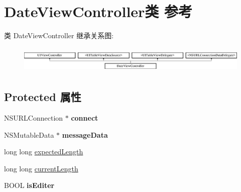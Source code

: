 \hypertarget{interface_date_view_controller}{\section{Date\-View\-Controller类 参考}
\label{interface_date_view_controller}
}
类 Date\-View\-Controller 继承关系图\-:\begin{figure}[H]
\begin{center}
\leavevmode
\includegraphics[height=1.308411cm]{interface_date_view_controller}
\end{center}
\end{figure}
\subsection*{Protected 属性}
\begin{DoxyCompactItemize}
\item 
\hypertarget{interface_date_view_controller_aff4f3095196456defce55a638c87b1d8}{N\-S\-U\-R\-L\-Connection $\ast$ {\bfseries connect}}\label{interface_date_view_controller_aff4f3095196456defce55a638c87b1d8}

\item 
\hypertarget{interface_date_view_controller_a5a2976ac7064733832735e5bd310bdfb}{N\-S\-Mutable\-Data $\ast$ {\bfseries message\-Data}}\label{interface_date_view_controller_a5a2976ac7064733832735e5bd310bdfb}

\item 
long long \hyperlink{interface_date_view_controller_ac977fba71126dc96513743e8db033743}{expected\-Length}
\item 
long long \hyperlink{interface_date_view_controller_a10154a7a8d6c08b5e8149c2678264c7e}{current\-Length}
\item 
\hypertarget{interface_date_view_controller_a43e1f8941f6b66644d17937f4f7e80ec}{B\-O\-O\-L {\bfseries is\-Editer}}\label{interface_date_view_controller_a43e1f8941f6b66644d17937f4f7e80ec}

\end{DoxyCompactItemize}

